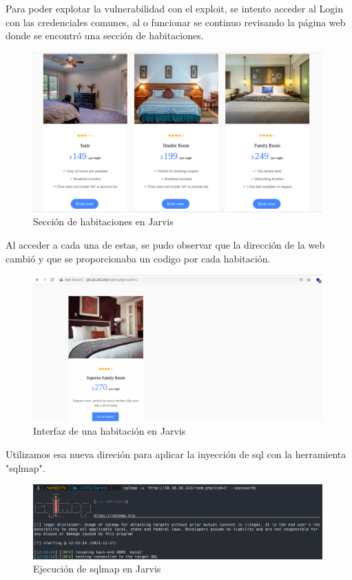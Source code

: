         \large{Para poder explotar la vulnerabilidad con el exploit, se intento acceder al Login con las credenciales comunes, al o funcionar se continuo revisando la página web donde se encontró una sección de habitaciones.}
        \par
        \begin{figure}[H]
            \centering
            \includegraphics[width=0.99\textwidth]{imagenes/jarvis/06_seccion_rooms_jarvis.png}
            \caption{Sección de habitaciones en Jarvis}
        \end{figure}

        \large{Al acceder a cada una de estas, se pudo observar que la dirección de la web cambió y que se proporcionaba un codigo por cada habitación.}
        \par
        \begin{figure}[H]
            \centering
            \includegraphics[width=0.99\textwidth]{imagenes/jarvis/07_room_jarvis.png}
            \caption{Interfaz de una habitación en Jarvis}
        \end{figure}

        \large{Utilizamos esa nueva direción para aplicar la inyección de sql con la herramienta "sqlmap".}
        \par
        \begin{figure}[H]
            \centering
            \includegraphics[width=0.99\textwidth]{imagenes/jarvis/08_sql_map_jarvis.png}
            \caption{Ejecución de sqlmap en Jarvis}
        \end{figure}

